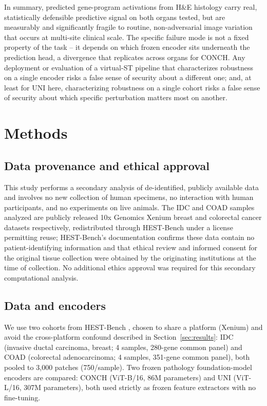 \documentclass[11pt]{article}
\begin{document}
In summary, predicted gene-program activations from H\&E histology carry real, statistically defensible predictive signal on both organs tested, but are measurably and significantly fragile to routine, non-adversarial image variation that occurs at multi-site clinical scale. The specific failure mode is not a fixed property of the task -- it depends on which frozen encoder sits underneath the prediction head, a divergence that replicates across organs for CONCH. Any deployment or evaluation of a virtual-ST pipeline that characterizes robustness on a single encoder risks a false sense of security about a different one; and, at least for UNI here, characterizing robustness on a single cohort risks a false sense of security about which specific perturbation matters most on another.

\section{Methods}
\label{sec:methods}

\subsection{Data provenance and ethical approval}
This study performs a secondary analysis of de-identified, publicly available data and involves no new collection of human specimens, no interaction with human participants, and no experiments on live animals. The IDC and COAD samples analyzed are publicly released 10x Genomics Xenium breast and colorectal cancer datasets respectively, redistributed through HEST-Bench \citep{hest1k_2024} under a license permitting reuse; HEST-Bench's documentation confirms these data contain no patient-identifying information and that ethical review and informed consent for the original tissue collection were obtained by the originating institutions at the time of collection. No additional ethics approval was required for this secondary computational analysis.

\subsection{Data and encoders}
We use two cohorts from HEST-Bench \citep{hest1k_2024}, chosen to share a platform (Xenium) and avoid the cross-platform confound described in Section~\ref{sec:results}: IDC (invasive ductal carcinoma, breast; 4 samples, 280-gene common panel) and COAD (colorectal adenocarcinoma; 4 samples, 351-gene common panel), both pooled to 3{,}000 patches (750/sample). Two frozen pathology foundation-model encoders are compared: CONCH \citep{conch_2024} (ViT-B/16, 86M parameters) and UNI \citep{uni_2024} (ViT-L/16, 307M parameters), both used strictly as frozen feature extractors with no fine-tuning.
\end{document}
